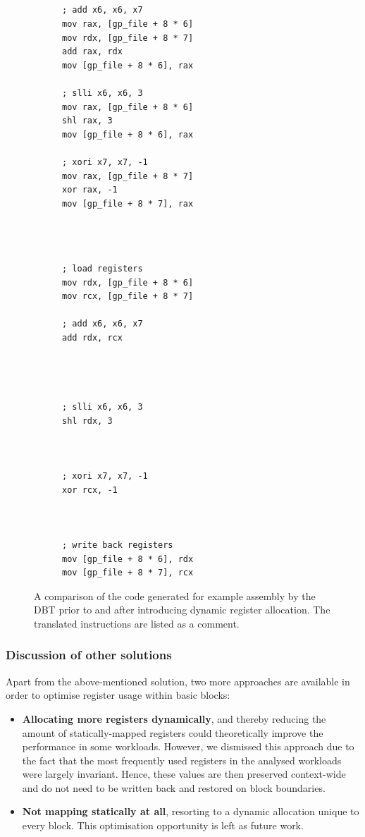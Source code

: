 \begin{figure}[h]
\begin{subfigure}{0.45\textwidth}
\begin{lstlisting}[label={lst:without-lazy-replace}, showlines=true]




; add x6, x6, x7
mov	rax, [gp_file + 8 * 6]
mov	rdx, [gp_file + 8 * 7]
add	rax, rdx
mov	[gp_file + 8 * 6], rax

; slli x6, x6, 3
mov	rax, [gp_file + 8 * 6]
shl	rax, 3
mov	[gp_file + 8 * 6], rax

; xori x7, x7, -1
mov	rax, [gp_file + 8 * 7]
xor	rax, -1
mov	[gp_file + 8 * 7], rax




\end{lstlisting}
\end{subfigure}
\hfill
\begin{subfigure}{0.45\textwidth}
\begin{lstlisting}[label={lst:with-lazy-replace}, showlines=true]
; load registers
mov rdx, [gp_file + 8 * 6]
mov rcx, [gp_file + 8 * 7]

; add x6, x6, x7
add	rdx, rcx




; slli x6, x6, 3
shl	rdx, 3



; xori x7, x7, -1
xor	rcx, -1



; write back registers
mov [gp_file + 8 * 6], rdx
mov [gp_file + 8 * 7], rcx
\end{lstlisting}
\end{subfigure}
\label{fig:lazy-replace-code}
\caption[Example assembly for dynamic register allocation]%
{A comparison of the code generated for example assembly by the DBT prior to and after introducing dynamic register allocation. The translated instructions are listed as a comment.}
\end{figure}


\subsubsection{Discussion of other solutions}
Apart from the above-mentioned solution, two more approaches are available in order to optimise register usage within basic blocks:
\begin{itemize}
	\item \textbf{Allocating more registers dynamically}, and thereby reducing the amount of statically-mapped registers could theoretically improve the performance in some workloads.
	However, we dismissed this approach due to the fact that the most frequently used registers in the analysed workloads were largely invariant.
	Hence, these values are then preserved context-wide and do not need to be written back and restored on block boundaries.
	
	\item \textbf{Not mapping statically at all}, resorting to a dynamic allocation unique to every block.
	This optimisation opportunity is left as future work.
\end{itemize}

